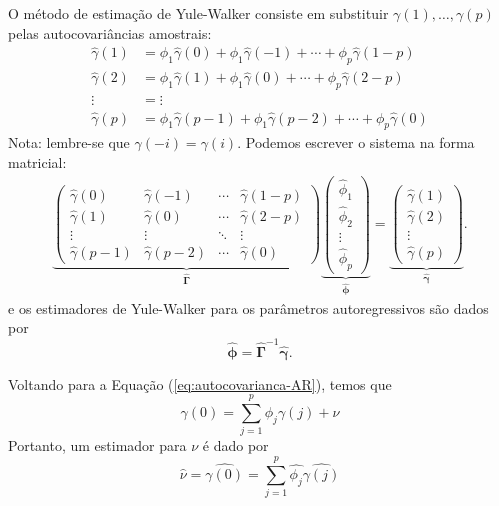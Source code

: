 \documentclass[
  letterpaper,
  DIV=11,
  numbers=noendperiod]{scrartcl}
\theoremstyle{definition}
\theoremstyle{definition}
\theoremstyle{plain}
\theoremstyle{plain}
\theoremstyle{remark}
\begin{document}
O método de estimação de Yule-Walker consiste em substituir
\(\gamma(1),\ldots,\gamma(p)\) pelas autocovariâncias amostrais:
\begin{align*}
\hat{\gamma}(1) &= \phi_1\hat{\gamma}(0) + \phi_1\hat{\gamma}(-1) + \cdots + \phi_p\hat{\gamma}(1-p) \\ 
\hat{\gamma}(2) &= \phi_1\hat{\gamma}(1) + \phi_1\hat{\gamma}(0)  + \cdots + \phi_p\hat{\gamma}(2-p) \\ 
\vdots &= \vdots \\
\hat{\gamma}(p) &= \phi_1\hat{\gamma}(p-1) + \phi_1\hat{\gamma}(p-2)  + \cdots + \phi_p\hat{\gamma}(0)
\end{align*} Nota: lembre-se que \(\gamma(-i)=\gamma(i)\). Podemos
escrever o sistema na forma matricial: \begin{align*}
    \underbrace{\left(
    \begin{array}{cccc}
\hat{\gamma}(0) & \hat{\gamma}(-1) & \cdots & \hat{\gamma}(1-p) \\ 
\hat{\gamma}(1) & \hat{\gamma}(0)  & \cdots & \hat{\gamma}(2-p) \\ 
         \vdots & \vdots               & \ddots                & \vdots\\
\hat{\gamma}(p-1) & \hat{\gamma}(p-2) &  \cdots & \hat{\gamma}(0)   
    \end{array}\right)}_{\hat{\boldsymbol{\Gamma}}}
    \underbrace{\left( \begin{array}{c} \hat{\phi}_1 \\ \hat{\phi}_2 \\ \vdots \\ \hat{\phi}_p   \end{array}\right)}_{\hat{\boldsymbol{\phi}}}=
    \underbrace{\left( \begin{array}{c} \hat{\gamma}(1) \\ \hat{\gamma}(2) \\ \vdots \\ \hat{\gamma}(p)   \end{array}\right)}_{\hat{\boldsymbol{\gamma}}}.
    \end{align*} e os estimadores de Yule-Walker para os parâmetros
autoregressivos são dados por
\[\hat{\boldsymbol{\phi}}=\hat{\boldsymbol{\Gamma}}^{-1}\hat{\boldsymbol{\gamma}}.\]

Voltando para a Equação (\ref{eq:autocovarianca-AR}), temos que
\[\gamma(0)=\sum_{j=1}^{p}\phi_j \gamma(j)+\nu\] Portanto, um estimador
para \(\nu\) é dado por \[\hat{\nu}=  
  \hat{\gamma(0)}=\sum_{j=1}^{p}\hat{\phi_j}\hat{\gamma(j)}\]
\end{document}
